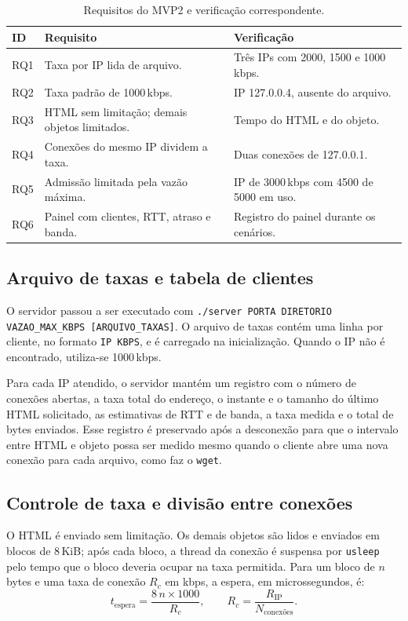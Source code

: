 \documentclass[12pt,a4paper]{article}
\begin{document}
\begin{table}[h]
\centering
\caption{Requisitos do MVP2 e verificação correspondente.}
\label{tab:req}
\small
\begin{tabularx}{\linewidth}{@{}lXX@{}}
\toprule
\textbf{ID} & \textbf{Requisito} & \textbf{Verificação} \\
\midrule
RQ1 & Taxa por IP lida de arquivo. & Três IPs com 2000, 1500 e 1000\,kbps. \\
RQ2 & Taxa padrão de 1000\,kbps. & IP 127.0.0.4, ausente do arquivo. \\
RQ3 & HTML sem limitação; demais objetos limitados. & Tempo do HTML e do objeto. \\
RQ4 & Conexões do mesmo IP dividem a taxa. & Duas conexões de 127.0.0.1. \\
RQ5 & Admissão limitada pela vazão máxima. & IP de 3000\,kbps com 4500 de 5000 em uso. \\
RQ6 & Painel com clientes, RTT, atraso e banda. & Registro do painel durante os cenários. \\
\bottomrule
\end{tabularx}
\end{table}

\subsection{Arquivo de taxas e tabela de clientes}

O servidor passou a ser executado com
\texttt{./server PORTA DIRETORIO VAZAO\_MAX\_KBPS [ARQUIVO\_TAXAS]}. O arquivo de taxas
contém uma linha por cliente, no formato \texttt{IP KBPS}, e é carregado na
inicialização. Quando o IP não é encontrado, utiliza-se 1000\,kbps.

Para cada IP atendido, o servidor mantém um registro com o número de conexões abertas, a
taxa total do endereço, o instante e o tamanho do último HTML solicitado, as estimativas de
RTT e de banda, a taxa medida e o total de bytes enviados. Esse registro é preservado após
a desconexão para que o intervalo entre HTML e objeto possa ser medido mesmo quando o
cliente abre uma nova conexão para cada arquivo, como faz o \texttt{wget}.

\subsection{Controle de taxa e divisão entre conexões}

O HTML é enviado sem limitação. Os demais objetos são lidos e enviados em blocos de
8\,KiB; após cada bloco, a thread da conexão é suspensa por \texttt{usleep} pelo tempo que
o bloco deveria ocupar na taxa permitida. Para um bloco de $n$ bytes e uma taxa de conexão
$R_c$ em kbps, a espera, em microssegundos, é:
\begin{equation}
t_{\mathrm{espera}} = \frac{8\,n \times 1000}{R_c}, \qquad R_c = \frac{R_{\mathrm{IP}}}{N_{\mathrm{conexões}}}.
\end{equation}
\end{document}
